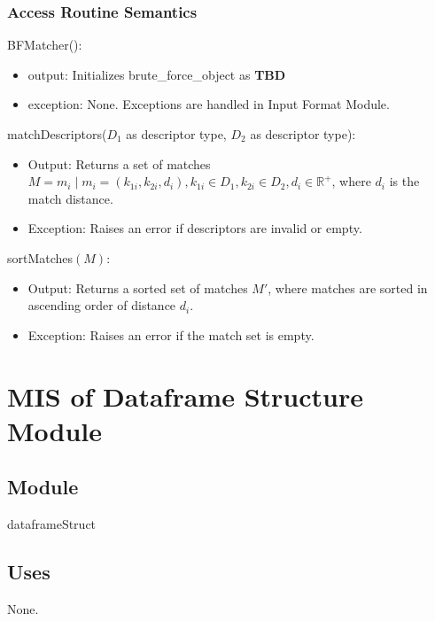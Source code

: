 \documentclass[12pt, titlepage]{article}
\begin{document}
\subsubsection{Access Routine Semantics}

\noindent BFMatcher():
\begin{itemize}
\item output: Initializes brute\_force\_object  as \textbf{TBD}
\item exception: None. Exceptions are handled in Input Format Module.
\end{itemize}

\noindent matchDescriptors($D_1$ as descriptor type, $D_2$ as descriptor type):
\begin{itemize}
\item Output: Returns a set of matches $M = { m_i \mid m_i = (k_{1i}, k_{2i}, d_i), 
k_{1i} \in D_1, k_{2i} \in D_2, d_i \in \mathbb{R}^+ }$, where $d_i$ is the match distance.
\item Exception: Raises an error if descriptors are invalid or empty.
\end{itemize}

\noindent sortMatches$(M)$: 
\begin{itemize} 
  \item Output: Returns a sorted set of matches $M'$, where matches are sorted in ascending order of distance $d_i$. 
  \item Exception: Raises an error if the match set is empty. 
\end{itemize}





\section{MIS of Dataframe Structure Module} \label{mDF} 



\subsection{Module}

dataframeStruct

\subsection{Uses}
None.
\end{document}
